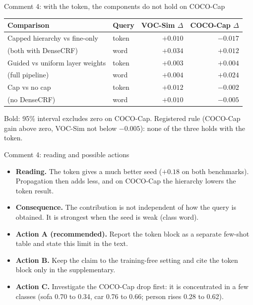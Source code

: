 \begin{frame}{Comment 4: with the token, the components do not hold on COCO-Cap}
\begin{slidetable}
\begin{tabular}{llrr}
\toprule
Comparison & Query & VOC-Sim $\Delta$ & COCO-Cap $\Delta$ \\
\midrule
Capped hierarchy vs fine-only & token & $+0.010$ & $\mathbf{-0.017}$ \\
(both with DenseCRF)          & word  & $+0.034$ & $+0.012$ \\
\midrule
Guided vs uniform layer weights & token & $+0.003$ & $+0.004$ \\
(full pipeline)                 & word  & $+0.004$ & $\mathbf{+0.024}$ \\
\midrule
Cap vs no cap & token & $+0.012$ & $-0.002$ \\
(no DenseCRF) & word  & $+0.010$ & $-0.005$ \\
\bottomrule
\end{tabular}
\end{slidetable}
Bold: 95\% interval excludes zero on COCO-Cap. Registered rule (COCO-Cap gain above zero, VOC-Sim not below $-0.005$): none of the three holds with the token.
\end{frame}

\begin{frame}{Comment 4: reading and possible actions}
\begin{itemize}
  \item \textbf{Reading.} The token gives a much better seed ($+0.18$ on both benchmarks). Propagation then adds less, and on COCO-Cap the hierarchy lowers the token result.
  \item \textbf{Consequence.} The contribution is not independent of how the query is obtained. It is strongest when the seed is weak (class word).
  \item \textbf{Action A (recommended).} Report the token block as a separate few-shot table and state this limit in the text.
  \item \textbf{Action B.} Keep the claim to the training-free setting and cite the token block only in the supplementary.
  \item \textbf{Action C.} Investigate the COCO-Cap drop first: it is concentrated in a few classes (sofa 0.70 to 0.34, car 0.76 to 0.66; person rises 0.28 to 0.62).
\end{itemize}
\end{frame}
